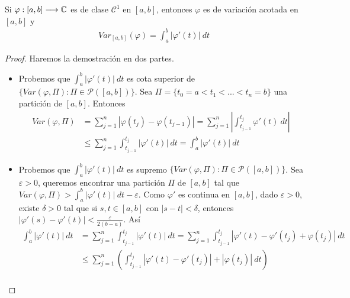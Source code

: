 \begin{prop}
    Si $\varphi : [a,b] \longrightarrow \mathbb{C}$ es de clase $\mathcal{C}^1$ en $[a,b]$, entonces $\varphi$ es de variación acotada en $[a,b]$ y
    \begin{align*}
        Var_{[a,b]}(\varphi) = \int_{a}^{b}{\left|\varphi'(t)\right| \ dt}
    \end{align*}
\end{prop}

\begin{proof}
    Haremos la demostración en dos partes.
    \begin{itemize}
        \item Probemos que $\int_{a}^{b}{\left|\varphi'(t)\right| \ dt}$ es cota superior de $\{Var(\varphi, \Pi) : \Pi \in \mathcal{P}([a,b])\}$. Sea $\Pi = \{t_0 = a < t_1 <... < t_n = b\}$ una partición de $[a,b]$. Entonces
              \begin{align*}
                  Var(\varphi, \Pi) & = \sum_{j=1}^{n}{|\varphi(t_j) - \varphi(t_{j-1})|} = \sum_{j=1}^{n}{\left| \int_{t_{j-1}}^{t_j}{\varphi'(t)} \ dt \right|} \\
                                    & \leq \sum_{j=1}^{n}{\int_{t_{j-1}}^{t_j}{|\varphi'(t)|} \ dt } = \int_{a}^{b}{\left|\varphi'(t)\right| \ dt}
              \end{align*}
        \item Probemos que $\int_{a}^{b}{\left|\varphi'(t)\right| \ dt}$ es supremo $\{Var(\varphi, \Pi) : \Pi \in \mathcal{P}([a,b])\}$. Sea $\varepsilon > 0$, queremos encontrar una partición $\Pi$ de $[a,b]$ tal que $Var(\varphi, \Pi) > \int_{a}^{b}{|\varphi'(t)| \ dt} - \varepsilon$. Como $\varphi'$ es continua en $[a,b]$, dado $\varepsilon > 0$, existe $\delta > 0$ tal que si $s,t \in [a,b]$ con $|s-t| < \delta$, entonces $|\varphi'(s) - \varphi'(t)| < \frac{\varepsilon}{2(b-a)}$. Así
              \begin{align*}
                  \int_{a}^{b}{\left|\varphi'(t)\right| \ dt} & = \sum_{j=1}^{n}{\int_{t_{j-1}}^{t_j}{|\varphi'(t)|} \ dt } =  \sum_{j=1}^{n}{\int_{t_{j-1}}^{t_j}{|\varphi'(t) -\varphi'(t_j) + \varphi(t_j)|} \ dt }                                                                          \\
                                                              & \leq \sum_{j=1}^{n}\left({\int_{t_{j-1}}^{t_j}{|\varphi'(t) -\varphi'(t_j)| + |\varphi(t_j)|} \ dt }\right)                                                                                                                     \\

\end{align*}
\end{itemize}
\end{proof}
